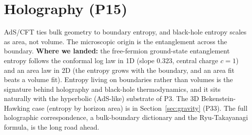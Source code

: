 \section{Holography (P15)}
\label{sec:holography}

AdS/CFT ties bulk geometry to boundary entropy, and black-hole entropy scales as area,
not volume. The microscopic origin is the entanglement across the boundary.
\textbf{Where we landed:} the free-fermion ground-state entanglement entropy follows the
conformal log law in 1D (slope $0.323$, central charge $c=1$) and an area law in 2D (the
entropy grows with the boundary, and an area fit beats a volume fit). Entropy living on
boundaries rather than volumes is the signature behind holography and black-hole
thermodynamics, and it sits naturally with the hyperbolic (AdS-like) substrate of P3.
The 3D Bekenstein-Hawking case (entropy by horizon area) is in
Section~\ref{sec:gravity} (P33). The full holographic correspondence, a bulk-boundary
dictionary and the Ryu-Takayanagi formula, is the long road ahead.
